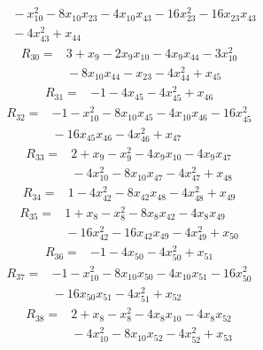 {\begin{align*}
&{}  - x_{10}^{2} - 8x_{10} x_{23} - 4x_{10} x_{43} - 16x_{23}^{2} - 16x_{23} x_{43} \\
&{}  - 4x_{43}^{2} + x_{44}
\end{align*}
\begin{align*}
R_{30} ={}& 3 + x_{9} - 2x_{9} x_{10} - 4x_{9} x_{44} - 3x_{10}^{2} \\
&{}  - 8x_{10} x_{44} - x_{23} - 4x_{44}^{2} + x_{45}
\end{align*}
\begin{align*}
R_{31} ={}& -1 - 4x_{45} - 4x_{45}^{2} + x_{46}
\end{align*}
\begin{align*}
R_{32} ={}& -1 - x_{10}^{2} - 8x_{10} x_{45} - 4x_{10} x_{46} - 16x_{45}^{2} \\
&{}  - 16x_{45} x_{46} - 4x_{46}^{2} + x_{47}
\end{align*}
\begin{align*}
R_{33} ={}& 2 + x_{9} - x_{9}^{2} - 4x_{9} x_{10} - 4x_{9} x_{47} \\
&{}  - 4x_{10}^{2} - 8x_{10} x_{47} - 4x_{47}^{2} + x_{48}
\end{align*}
\begin{align*}
R_{34} ={}& 1 - 4x_{42}^{2} - 8x_{42} x_{48} - 4x_{48}^{2} + x_{49}
\end{align*}
\begin{align*}
R_{35} ={}& 1 + x_{8} - x_{8}^{2} - 8x_{8} x_{42} - 4x_{8} x_{49} \\
&{}  - 16x_{42}^{2} - 16x_{42} x_{49} - 4x_{49}^{2} + x_{50}
\end{align*}
\begin{align*}
R_{36} ={}& -1 - 4x_{50} - 4x_{50}^{2} + x_{51}
\end{align*}
\begin{align*}
R_{37} ={}& -1 - x_{10}^{2} - 8x_{10} x_{50} - 4x_{10} x_{51} - 16x_{50}^{2} \\
&{}  - 16x_{50} x_{51} - 4x_{51}^{2} + x_{52}
\end{align*}
\begin{align*}
R_{38} ={}& 2 + x_{8} - x_{8}^{2} - 4x_{8} x_{10} - 4x_{8} x_{52} \\
&{}  - 4x_{10}^{2} - 8x_{10} x_{52} - 4x_{52}^{2} + x_{53}

\end{align*}}
